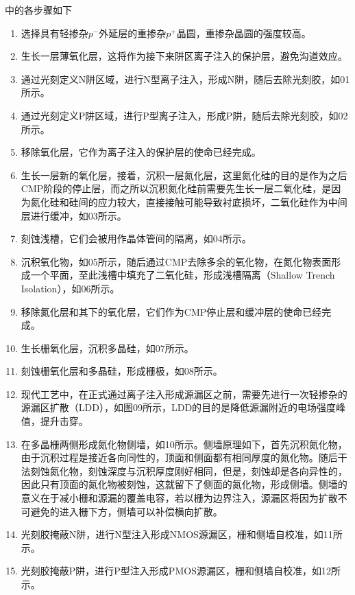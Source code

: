 中的各步骤如下
\begin{enumerate}
    \item 选择具有轻掺杂$p^{-}$外延层的重掺杂$p^{+}$晶圆，重掺杂晶圆的强度较高。
    \item 生长一层薄氧化层，这将作为接下来阱区离子注入的保护层，避免沟道效应。
    \item 通过光刻定义N阱区域，进行N型离子注入，形成N阱，随后去除光刻胶，如01所示。
    \item 通过光刻定义\hspace{0.41em}P阱区域，进行\hspace{0.41em}P型离子注入，形成\hspace{0.41em}P阱，随后去除光刻胶，如02所示。
    \item 移除氧化层，它作为离子注入的保护层的使命已经完成。
    \item 生长一层新的氧化层，接着，沉积一层氮化层，这里氮化硅的目的是作为之后CMP阶段的停止层，而之所以沉积氮化硅前需要先生长一层二氧化硅，是因为氮化硅和硅间的应力较大，直接接触可能导致衬底损坏，二氧化硅作为中间层进行缓冲，如03所示。
    \item 刻蚀浅槽，它们会被用作晶体管间的隔离，如04所示。
    \item 沉积氧化物，如05所示，随后通过CMP去除多余的氧化物，在氮化物表面形成一个平面，至此浅槽中填充了二氧化硅，形成浅槽隔离（Shallow Trench Isolation），如06所示。
    \item 移除氮化层和其下的氧化层，它们作为CMP停止层和缓冲层的使命已经完成。
    \item 生长栅氧化层，沉积多晶硅，如07所示。
    \item 刻蚀栅氧化层和多晶硅，形成栅极，如08所示。
    \item 现代工艺中，在正式通过离子注入形成源漏区之前，需要先进行一次轻掺杂的源漏区扩散（LDD），如图09所示，LDD的目的是降低源漏附近的电场强度峰值，提升击穿。
    \item 在多晶栅两侧形成氮化物侧墙，如10所示。侧墙原理如下，首先沉积氮化物，由于沉积过程是接近各向同性的，顶面和侧面都有相同厚度的氮化物。随后干法刻蚀氮化物，刻蚀深度与沉积厚度刚好相同，但是，刻蚀却是各向异性的，因此只有顶面的氮化物被刻蚀，这就留下了侧面的氮化物，形成侧墙。侧墙的意义在于减小栅和源漏的覆盖电容，若以栅为边界注入，源漏区将因为扩散不可避免的进入栅下方，侧墙可以补偿横向扩散。
    \item 光刻胶掩蔽N阱，进行N型注入形成NMOS源漏区，栅和侧墙自校准，如11所示。
    \item 光刻胶掩蔽\hspace{0.41em}P阱，进行\hspace{0.41em}P型注入形成\hspace{0.41em}PMOS源漏区，栅和侧墙自校准，如12所示。

\end{enumerate}
